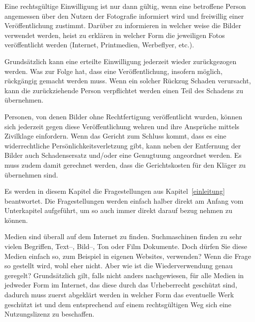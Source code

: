 Eine rechtsgültige Einwilligung ist nur dann gültig, wenn eine betroffene Person angemessen über den Nutzen der Fotografie
informiert wird und freiwillig einer Veröffentlichung zustimmt.
Darüber zu informieren in welcher weise die Bilder verwendet werden, heist zu erklären in welcher Form die jeweiligen Fotos
veröffentlicht werden (Internet, Printmedien, Werbeflyer, etc.).

Grundsätzlich kann eine erteilte Einwilligung jederzeit wieder zurückgezogen werden.
Was zur Folge hat, dass eine Veröffentlichung, insofern möglich, rückgängig gemacht werden muss.
Wenn ein solcher Rückzug Schaden verursacht, kann die zurückziehende Person verpflichtet werden einen Teil
des Schadens zu übernehmen.

Personen, von denen Bilder ohne Rechtfertigung veröffentlicht wurden, können sich jederzeit gegen diese Veröffentlichung
wehren und ihre Ansprüche mittels Zivilklage einfordern.
Wenn das Gericht zum Schluss kommt, dass es eine widerrechtliche Persönlichkeitsverletzung gibt, kann neben der
Entfernung der Bilder auch Schadensersatz und/oder eine Genugtuung angeordnet werden.
Es muss zudem damit gerechnet werden, dass die Gerichtskosten für den Kläger zu übernehmen sind.


Es werden in diesem Kapitel die Fragestellungen aus Kapitel~\ref{einleitung} beantwortet.
Die Fragestellungen werden einfach halber direkt am Anfang vom Unterkapitel aufgeführt, um so auch immer
direkt darauf bezug nehmen zu können.

Medien sind überall auf dem Internet zu finden.
Suchmaschinen finden zu sehr vielen Begriffen,
Text–, Bild–, Ton oder Film Dokumente.
Doch dürfen Sie diese Medien einfach so, zum Beispiel in
eigenen Websites, verwenden?\newline\newline
Wenn die Frage so gestellt wird, wohl eher nicht.
Aber wie ist die Wiederverwendung genau geregelt?\newline\newline
Grundsätzlich gilt, falls nicht anders nachgewiesen, für alle Medien in jedweder Form im Internet, das diese
durch das Urheberrecht geschützt sind, dadurch muss zuerst abgeklärt werden in welcher Form das eventuelle
Werk geschützt ist und dem entsprechend auf einem rechtsgültigen Weg sich eine Nutzungslizenz zu beschaffen.


